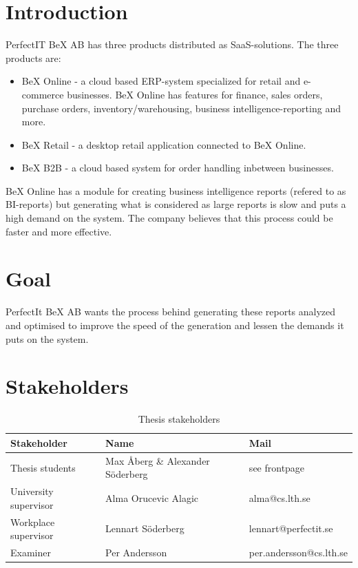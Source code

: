 \documentclass[12pt,a4paper]{article}
\begin{document}
\newpage

\vspace*{-2\baselineskip}

\section*{Introduction}
PerfectIT BeX AB has three products distributed as SaaS-solutions. The three products are:
\begin{itemize}
\item BeX Online - a cloud based ERP-system specialized for retail and e-commerce businesses. BeX Online has features for finance, sales orders, purchase orders, inventory/warehousing, business intelligence-reporting and more. 
\item BeX Retail - a desktop retail application connected to BeX Online.
\item BeX B2B - a cloud based system for order handling inbetween businesses.
\end{itemize}

BeX Online has a module for creating business intelligence reports (refered to as BI-reports) but generating what is considered as large reports is slow and puts a high demand on the system. The company believes that this process could be faster and more effective. 

\section*{Goal}
PerfectIt BeX AB wants the process behind generating these reports analyzed and optimised to improve the speed of the generation and lessen the demands it puts on the system.
\section*{Stakeholders}
\begin{table}[H]
    \begin{tabular}{l|l|l}
    Stakeholder & Name & Mail \\\hline
    Thesis students & Max Åberg \& Alexander Söderberg & see frontpage \\\hline
    University supervisor & Alma Orucevic Alagic & alma@cs.lth.se\\\hline
    Workplace supervisor & Lennart Söderberg & lennart@perfectit.se\\\hline
    Examiner & Per Andersson & per.andersson@cs.lth.se 
    \end{tabular}
    \caption{Thesis stakeholders}
\end{table}
\end{document}
